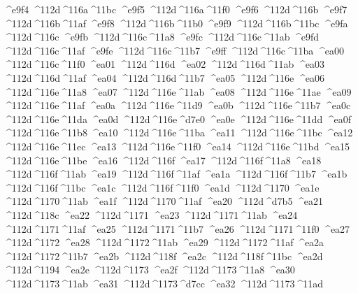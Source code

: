 \checkit ^^^^e9f4 ^^^^112d^^^^116a^^^^11bc
\checkit ^^^^e9f5 ^^^^112d^^^^116a^^^^11f0
\checkit ^^^^e9f6 ^^^^112d^^^^116b
\checkit ^^^^e9f7 ^^^^112d^^^^116b^^^^11af
\checkit ^^^^e9f8 ^^^^112d^^^^116b^^^^11b0
\checkit ^^^^e9f9 ^^^^112d^^^^116b^^^^11bc
\checkit ^^^^e9fa ^^^^112d^^^^116c
\checkit ^^^^e9fb ^^^^112d^^^^116c^^^^11a8
\checkit ^^^^e9fc ^^^^112d^^^^116c^^^^11ab
\checkit ^^^^e9fd ^^^^112d^^^^116c^^^^11af
\checkit ^^^^e9fe ^^^^112d^^^^116c^^^^11b7
\checkit ^^^^e9ff ^^^^112d^^^^116c^^^^11ba
\checkit ^^^^ea00 ^^^^112d^^^^116c^^^^11f0
\checkit ^^^^ea01 ^^^^112d^^^^116d
\checkit ^^^^ea02 ^^^^112d^^^^116d^^^^11ab
\checkit ^^^^ea03 ^^^^112d^^^^116d^^^^11af
\checkit ^^^^ea04 ^^^^112d^^^^116d^^^^11b7
\checkit ^^^^ea05 ^^^^112d^^^^116e
\checkit ^^^^ea06 ^^^^112d^^^^116e^^^^11a8
\checkit ^^^^ea07 ^^^^112d^^^^116e^^^^11ab
\checkit ^^^^ea08 ^^^^112d^^^^116e^^^^11ae
\checkit ^^^^ea09 ^^^^112d^^^^116e^^^^11af
\checkit ^^^^ea0a ^^^^112d^^^^116e^^^^11d9
\checkit ^^^^ea0b ^^^^112d^^^^116e^^^^11b7
\checkit ^^^^ea0c ^^^^112d^^^^116e^^^^11da
\checkit ^^^^ea0d ^^^^112d^^^^116e^^^^d7e0
\checkit ^^^^ea0e ^^^^112d^^^^116e^^^^11dd
\checkit ^^^^ea0f ^^^^112d^^^^116e^^^^11b8
\checkit ^^^^ea10 ^^^^112d^^^^116e^^^^11ba
\checkit ^^^^ea11 ^^^^112d^^^^116e^^^^11bc
\checkit ^^^^ea12 ^^^^112d^^^^116e^^^^11ec
\checkit ^^^^ea13 ^^^^112d^^^^116e^^^^11f0
\checkit ^^^^ea14 ^^^^112d^^^^116e^^^^11bd
\checkit ^^^^ea15 ^^^^112d^^^^116e^^^^11be
\checkit ^^^^ea16 ^^^^112d^^^^116f
\checkit ^^^^ea17 ^^^^112d^^^^116f^^^^11a8
\checkit ^^^^ea18 ^^^^112d^^^^116f^^^^11ab
\checkit ^^^^ea19 ^^^^112d^^^^116f^^^^11af
\checkit ^^^^ea1a ^^^^112d^^^^116f^^^^11b7
\checkit ^^^^ea1b ^^^^112d^^^^116f^^^^11bc
\checkit ^^^^ea1c ^^^^112d^^^^116f^^^^11f0
\checkit ^^^^ea1d ^^^^112d^^^^1170
\checkit ^^^^ea1e ^^^^112d^^^^1170^^^^11ab
\checkit ^^^^ea1f ^^^^112d^^^^1170^^^^11af
\checkit ^^^^ea20 ^^^^112d^^^^d7b5
\checkit ^^^^ea21 ^^^^112d^^^^118c
\checkit ^^^^ea22 ^^^^112d^^^^1171
\checkit ^^^^ea23 ^^^^112d^^^^1171^^^^11ab
\checkit ^^^^ea24 ^^^^112d^^^^1171^^^^11af
\checkit ^^^^ea25 ^^^^112d^^^^1171^^^^11b7
\checkit ^^^^ea26 ^^^^112d^^^^1171^^^^11f0
\checkit ^^^^ea27 ^^^^112d^^^^1172
\checkit ^^^^ea28 ^^^^112d^^^^1172^^^^11ab
\checkit ^^^^ea29 ^^^^112d^^^^1172^^^^11af
\checkit ^^^^ea2a ^^^^112d^^^^1172^^^^11b7
\checkit ^^^^ea2b ^^^^112d^^^^118f
\checkit ^^^^ea2c ^^^^112d^^^^118f^^^^11bc
\checkit ^^^^ea2d ^^^^112d^^^^1194
\checkit ^^^^ea2e ^^^^112d^^^^1173
\checkit ^^^^ea2f ^^^^112d^^^^1173^^^^11a8
\checkit ^^^^ea30 ^^^^112d^^^^1173^^^^11ab
\checkit ^^^^ea31 ^^^^112d^^^^1173^^^^d7cc
\checkit ^^^^ea32 ^^^^112d^^^^1173^^^^11ad
